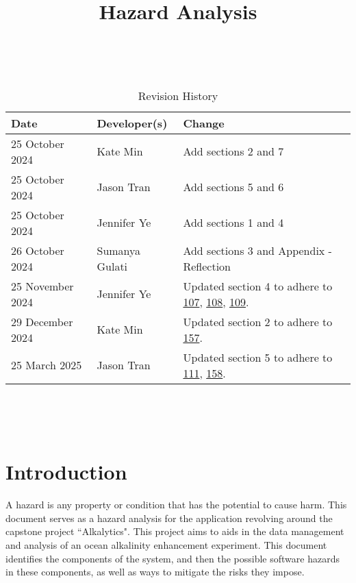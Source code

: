 \documentclass{article}
\title{Hazard Analysis\\\progname}
\author{\authname}
\date{}
\begin{document}
\maketitle
\thispagestyle{empty}

~\newpage


\begin{table}[hp]
\caption{Revision History} \label{TblRevisionHistory}
\begin{tabularx}{\textwidth}{llX}
\toprule
\textbf{Date} & \textbf{Developer(s)} & \textbf{Change}\\
\midrule
25 October 2024 & Kate Min & Add sections 2 and 7\\
25 October 2024 & Jason Tran & Add sections 5 and 6\\
25 October 2024 & Jennifer Ye & Add sections 1 and 4\\
26 October 2024 & Sumanya Gulati & Add sections 3 and Appendix - Reflection\\
25 November 2024 & Jennifer Ye & Updated section 4 to adhere to
\href{https://github.com/SumanyaG/Alkalytics/issues/107}{107},
\href{https://github.com/SumanyaG/Alkalytics/issues/108}{108},
\href{https://github.com/SumanyaG/Alkalytics/issues/109}{109}. \\
29 December 2024 & Kate Min & Updated section 2 to adhere to
\href{https://github.com/SumanyaG/Alkalytics/issues/157}{157}. \\
25 March 2025 & Jason Tran & Updated section 5 to adhere to 
\href{https://github.com/SumanyaG/Alkalytics/issues/111}{111},
\href{https://github.com/SumanyaG/Alkalytics/issues/158}{158}. \\
\bottomrule
\end{tabularx}
\end{table}

~\newpage

\tableofcontents

~\newpage


\section{Introduction}

A hazard is any property or condition that has the potential to cause harm. This
document serves as a hazard analysis for the application revolving around the
capstone project ``Alkalytics". This project aims to aids in the data management
and analysis of an ocean alkalinity enhancement experiment. This document
identifies the components of the system, and then the possible software hazards
in these components, as well as ways to mitigate the risks they impose.
\end{document}
